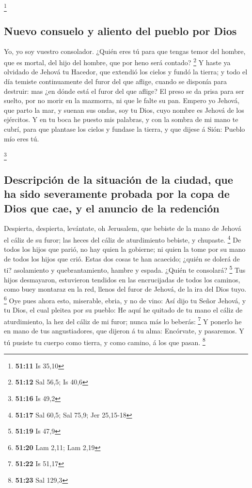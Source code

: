 \footnote{\textbf{51:11} Is 35,10}

\hypertarget{nuevo-consuelo-y-aliento-del-pueblo-por-dios}{%
\subsection{Nuevo consuelo y aliento del pueblo por
Dios}\label{nuevo-consuelo-y-aliento-del-pueblo-por-dios}}

 Yo, yo soy vuestro consolador. ¿Quién eres tú para que
tengas temor del hombre, que es mortal, del hijo del hombre, que por
heno será contado? \footnote{\textbf{51:12} Sal 56,5; Is 40,6}
 Y haste ya olvidado de Jehová tu Hacedor, que extendió
los cielos y fundó la tierra; y todo el día temiste continuamente del
furor del que aflige, cuando se disponía para destruir: mas ¿en dónde
está el furor del que aflige?  El preso se da prisa para
ser suelto, por no morir en la mazmorra, ni que le falte su pan.
 Empero yo Jehová, que parto la mar, y suenan sus ondas,
soy tu Dios, cuyo nombre es Jehová de los ejércitos.  Y
en tu boca he puesto mis palabras, y con la sombra de mi mano te cubrí,
para que plantase los cielos y fundase la tierra, y que dijese á Sión:
Pueblo mío eres tú.

\footnote{\textbf{51:16} Is 49,2}

\hypertarget{descripciuxf3n-de-la-situaciuxf3n-de-la-ciudad-que-ha-sido-severamente-probada-por-la-copa-de-dios-que-cae-y-el-anuncio-de-la-redenciuxf3n}{%
\subsection{Descripción de la situación de la ciudad, que ha sido
severamente probada por la copa de Dios que cae, y el anuncio de la
redención}\label{descripciuxf3n-de-la-situaciuxf3n-de-la-ciudad-que-ha-sido-severamente-probada-por-la-copa-de-dios-que-cae-y-el-anuncio-de-la-redenciuxf3n}}

 Despierta, despierta, levántate, oh Jerusalem, que
bebiste de la mano de Jehová el cáliz de su furor; las heces del cáliz
de aturdimiento bebiste, y chupaste. \footnote{\textbf{51:17} Sal 60,5;
  Sal 75,9; Jer 25,15-18}  De todos los hijos que parió,
no hay quien la gobierne; ni quien la tome por su mano de todos los
hijos que crió.  Estas dos cosas te han acaecido; ¿quién
se dolerá de ti? asolamiento y quebrantamiento, hambre y espada. ¿Quién
te consolará? \footnote{\textbf{51:19} Is 47,9}  Tus
hijos desmayaron, estuvieron tendidos en las encrucijadas de todos los
caminos, como buey montaraz en la red, llenos del furor de Jehová, de la
ira del Dios tuyo. \footnote{\textbf{51:20} Lam 2,11; Lam 2,19}
 Oye pues ahora esto, miserable, ebria, y no de vino:
 Así dijo tu Señor Jehová, y tu Dios, el cual pleitea por
su pueblo: He aquí he quitado de tu mano el cáliz de aturdimiento, la
hez del cáliz de mi furor; nunca más lo beberás: \footnote{\textbf{51:22}
  Is 51,17}  Y ponerlo he en mano de tus angustiadores,
que dijeron á tu alma: Encórvate, y pasaremos. Y tú pusiste tu cuerpo
como tierra, y como camino, á los que pasan. \footnote{\textbf{51:23}
  Sal 129,3}

